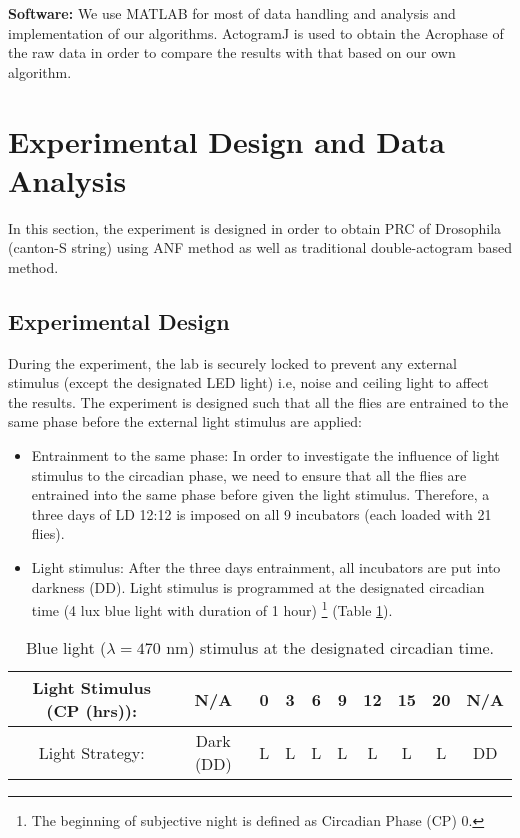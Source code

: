 \documentclass[11pt, onecolumn]{IEEEtran}
\begin{document}
\medskip
\textbf{Software:}
We use MATLAB for most of data handling and analysis and implementation of our algorithms. ActogramJ \cite{ActoJ} is used to obtain the Acrophase of the raw data in order to compare the results with that based on our own algorithm.


\section{Experimental Design and Data Analysis}\label{Exp:Sec}
In this section, the experiment is designed in order to obtain PRC of Drosophila (canton-S string) using ANF method as well as traditional double-actogram based method.

\subsection{Experimental Design}
During the experiment, the lab is securely locked to prevent any external stimulus (except the designated LED light) i.e, noise and ceiling light to affect the results. The experiment is designed such that all the flies are entrained to the same phase before the external light stimulus are applied:

\begin{itemize}
\item[(1)] Entrainment to the same phase: In order to investigate the influence of light stimulus to the circadian phase, we need to ensure that all the flies are entrained into the same phase before given the light stimulus. Therefore, a three days of LD 12:12 is imposed on all 9 incubators (each loaded with 21 flies).\\
\item[(2)] Light stimulus: After the three days entrainment, all incubators are put into darkness (DD). Light stimulus is programmed at the designated circadian time (4 lux blue light with duration of 1 hour) \footnote{The beginning of subjective night is defined as Circadian Phase (CP) 0.} (Table \ref{PRC:table}). \\
\end{itemize}

\begin{table}
\begin{center}
\begin{tabular}{|c|c|c|c|c|c|c|c|c|c|}
  \hline
  Light Stimulus (CP (hrs)): & N/A & 0 & 3 & 6 & 9 & 12 & 15 & 20 & N/A  \\\hline
  Light Strategy: & Dark (DD) & L & L & L & L & L & L & L & DD \\
  \hline

\end{tabular}
\end{center}
\caption{Blue light ($\lambda = 470$ nm) stimulus at the designated circadian time.\label{PRC:table}}
\end{table}
\end{document}

